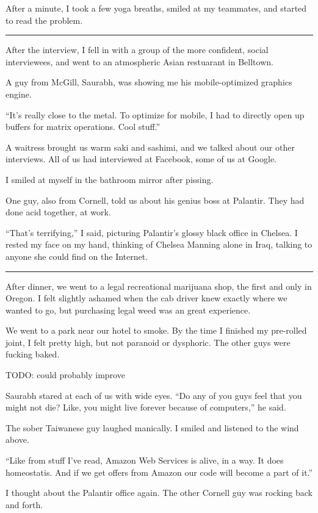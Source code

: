 After a minute, I took a few yoga breaths, smiled at my teammates, and started
to read the problem.

\plainfancybreak{12pt}{2}{* * *}

After the interview, I fell in with a group of the more confident, social
interviewees, and went to an atmospheric Asian restuarant in Belltown.

A guy from McGill, Saurabh, was showing me his mobile-optimized graphics engine.

``It's really close to the metal.  To optimize for mobile, I had to directly
open up buffers for matrix operations.  Cool stuff.''

A waitress brought us warm saki and sashimi, and we talked about our other
interviews.  All of us had interviewed at Facebook, some of us at Google.  

I smiled at myself in the bathroom mirror after pissing.

One guy, also from Cornell, told us about his genius boss at Palantir.  They had
done acid together, at work.

``That's terrifying,'' I said, picturing Palantir's glossy black office in
Chelsea.  I rested my face on my hand, thinking of Chelsea Manning alone in
Iraq, talking to anyone she could find on the Internet.

\plainfancybreak{12pt}{2}{* * *}

After dinner, we went to a legal recreational marijuana shop, the first and only
in Oregon.  I felt slightly ashamed when the cab driver knew exactly where we
wanted to go, but purchasing legal weed was an great experience.

We went to a park near our hotel to smoke.  By the time I finished my pre-rolled
joint, I felt pretty high, but not paranoid or dysphoric.  The other guys were
fucking baked. 

TODO: could probably improve

Saurabh stared at each of us with wide eyes.  ``Do any of you guys feel that you
might not die?  Like, you might live forever because of computers,'' he said.

The sober Taiwanese guy laughed manically.  I smiled and listened to the wind
above.

``Like from stuff I've read, Amazon Web Services is alive, in a way.  It does
homeostatis.  And if we get offers from Amazon our code will become a part of
it.''

I thought about the Palantir office again.  The other Cornell guy was rocking
back and forth.

